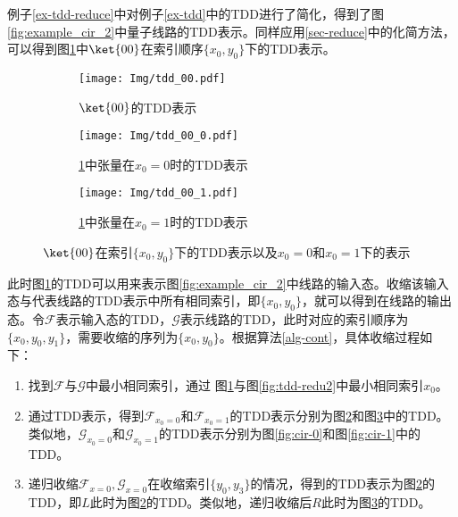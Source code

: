 \begin{example}
    例子\ref{ex-tdd-reduce}中对例子\ref{ex-tdd}中的TDD进行了简化，得到了图\ref{fig:example_cir_2}中量子线路的TDD表示。同样应用\ref{sec-reduce}中的化简方法，可以得到图\ref{fig-00-01}中\(\ket{00}\)在索引顺序\(\{x_0,y_0\}\)下的TDD表示。
    \begin{figure}[!htbp]
        \begin{subfigure}[b]{.3\textwidth}
            \centering
            \texttt{[image: Img/tdd\_00.pdf]}
            \caption{\(\ket{00}\)的TDD表示}
            \label{fig-00-01}
        \end{subfigure}
        \begin{subfigure}[b]{.3\textwidth}
            \centering
            \texttt{[image: Img/tdd\_00\_0.pdf]}
            \caption{\ref{fig-00-01}中张量在\(x_0=0\)时的TDD表示}
            \label{fig-00-0}
        \end{subfigure}
        \quad
        \begin{subfigure}[b]{.3\textwidth}
            \centering
            \texttt{[image: Img/tdd\_00\_1.pdf]}
            \caption{\ref{fig-00-01}中张量在\(x_0=1\)时的TDD表示}
            \label{fig-00-1}
        \end{subfigure}
        \caption{\(\ket{00}\)在索引\(\{x_0,y_0\}\)下的TDD表示以及\(x_0=0\)和\(x_0=1\)下的表示}
        \label{fig-00}
    \end{figure}
    此时图\ref{fig-00-01}的TDD可以用来表示图\ref{fig:example_cir_2}中线路的输入态。收缩该输入态与代表线路的TDD表示中所有相同索引，即\(\{x_0,y_0\}\)，就可以得到在线路的输出态。令\(\mathcal{F}\)表示输入态的TDD，\(\mathcal{G}\)表示线路的TDD，此时对应的索引顺序为\(\{x_0,y_0,y_1\}\)，需要收缩的序列为\(\{x_0,y_0\}\)。根据算法\ref{alg-cont}，具体收缩过程如下：
    \begin{enumerate}
        \item 找到\(\mathcal{F}\)与\(\mathcal{G}\)中最小相同索引，通过
        图\ref{fig-00-01}与图\ref{fig:tdd-redu2}中最小相同索引\(x_0\)。
        \item 通过TDD表示，得到\(\mathcal{F}_{x_0 = 0}\)和\(\mathcal{F}_{x_0 = 1}\)的TDD表示分别为图\ref{fig-00-0}和图\ref{fig-00-1}中的TDD。类似地，\(\mathcal{G}_{x_0 = 0}\)和\(\mathcal{G}_{x_0 = 1}\)的TDD表示分别为图\ref{fig:cir-0}和图\ref{fig:cir-1}中的TDD。
        \item 递归收缩\(\mathcal{F}_{x=0}, \mathcal{G}_{x=0}\)在收缩索引\(\{y_0,y_3\}\)的情况，得到的TDD表示为图\ref{fig-00-0}的TDD，即\(L\)此时为图\ref{fig-00-0}的TDD。类似地，递归收缩后\(R\)此时为图\ref{fig-00-1}的TDD。

\end{enumerate}
\end{example}
